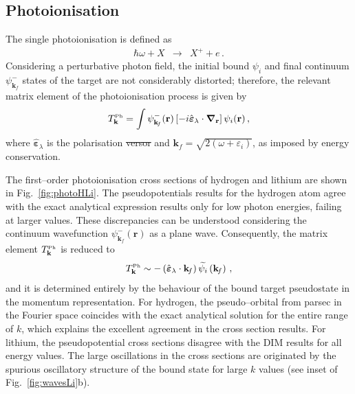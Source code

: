\documentclass[10pt]{article}
\providecommand{\DIFaddtex}[1]{{\protect\color{blue}\uwave{#1}}} %
\providecommand{\DIFdeltex}[1]{{\protect\color{red}\sout{#1}}}                      %
\providecommand{\DIFaddbegin}{} %
\providecommand{\DIFaddend}{} %
\providecommand{\DIFdelbegin}{} %
\providecommand{\DIFdelend}{} %
\providecommand{\DIFadd}[1]{\texorpdfstring{\DIFaddtex{#1}}{#1}} %
\providecommand{\DIFdel}[1]{\texorpdfstring{\DIFdeltex{#1}}{}} %
\begin{document}
\subsection{Photoionisation}
\label{sec:photoatom}

The single photoionisation is defined as
\begin{eqnarray}
 \hbar\omega + X &\rightarrow& X^+ + e\,.
\end{eqnarray}
Considering a perturbative photon field, the initial bound $\psi_{i}$ 
and final continuum $\psi_{\mathbf{k}_{\!f}}^-$ states of the target 
are not considerably distorted; therefore, the relevant matrix 
element of the photoionisation process is given by
\begin{equation}
 T_{\mathbf{k}}^{\mbox{\tiny Ph}} = \int{
 \psi_{\mathbf{k}_{\!f}}^-(\mathbf{r}) 
 \left[-i \hat{\boldsymbol{\varepsilon}}_\lambda \cdot 
 \boldsymbol{\nabla}_\mathbf{r}\right] 
 \psi_{i}(\mathbf{r})}\,,
\end{equation}
where $\hat{\boldsymbol{\varepsilon}}_\lambda$ is the polarisation 
\DIFdelbegin \DIFdel{versor }\DIFdelend \DIFaddbegin \DIFadd{vector }\DIFaddend and $\mathbf{k}_{\!f}=\sqrt{2(\omega+\varepsilon_i)}$, as 
imposed by energy conservation.

The first--order photoionisation cross sections of hydrogen and 
lithium are shown in Fig.~\ref{fig:photoHLi}. The pseudopotentials 
results for the hydrogen atom agree with the exact analytical 
expression results only for low photon energies, failing at larger 
values. These discrepancies can be understood considering the 
continuum wavefunction $\psi_{\mathbf{k}_{\!f}}^-(\mathbf{r})$ as a 
plane wave. Consequently, the matrix element 
$T_{\mathbf{k}}^{\mbox{\tiny Ph}}$ is reduced to
\begin{equation}
 T_{\mathbf{k}}^{\mbox{\tiny Ph}} \sim 
 -\left(\hat{\boldsymbol{\varepsilon}}_\lambda \cdot \mathbf{k}_{\!f} \right)
 \widetilde{\psi_i} \left(\mathbf{k}_{\!f}\right)\,,
\end{equation}
and it is determined entirely by the behaviour of the bound target 
pseudostate in the momentum representation. For hydrogen, the 
pseudo--orbital from {\sc parsec} in the Fourier space coincides with 
the exact analytical solution for the entire range of $k$, which 
explains the excellent agreement in the cross section results. For 
lithium, the pseudopotential cross sections disagree with the DIM 
results for all energy values. The large oscillations in the cross 
sections are originated by the spurious oscillatory structure of the 
bound state for large $k$ values (see inset of 
Fig.~\ref{fig:wavesLi}b).
\end{document}

